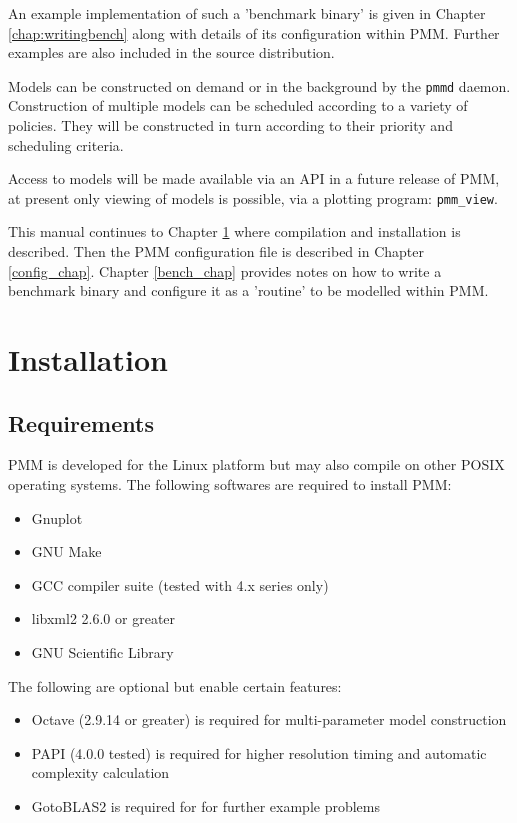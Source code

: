 \documentclass[a4paper,12pt]{report}
\begin{document}
    An example implementation of such a 'benchmark binary' is given in Chapter
    \ref{chap:writingbench} along with details of its configuration within PMM.
    Further examples are also included in the source distribution.

    Models can be constructed on demand or in the background by the \verb+pmmd+
    daemon. Construction of multiple models can be scheduled according to a
    variety of policies. They will be constructed in turn according to their
    priority and scheduling criteria.

    Access to models will be made available via an API in a future release of
    PMM, at present only viewing of models is possible, via a plotting program:
    \verb+pmm_view+.

    This manual continues to Chapter \ref{install_chap} where compilation and 
    installation is described. Then the PMM configuration file is described in
    Chapter \ref{config_chap}. Chapter \ref{bench_chap} provides notes on how
    to write a benchmark binary and configure it as a 'routine' to be modelled
    within
    PMM.

    \chapter{Installation}
    \label{install_chap}

    \section{Requirements}
    PMM is developed for the Linux platform but may also compile on other POSIX
    operating systems. The following softwares are required to install PMM:
    \begin{itemize}
        \item Gnuplot
        \item GNU Make
        \item GCC compiler suite (tested with 4.x series only)
        \item libxml2 2.6.0 or greater
        \item GNU Scientific Library
    \end{itemize}
    The following are optional but enable certain features:
    \begin{itemize}
        \item Octave (2.9.14 or greater) is required for multi-parameter model construction
        \item PAPI (4.0.0 tested) is required for higher resolution timing and automatic complexity calculation
        \item GotoBLAS2 is required for for further example problems
    \end{itemize}
\end{document}
